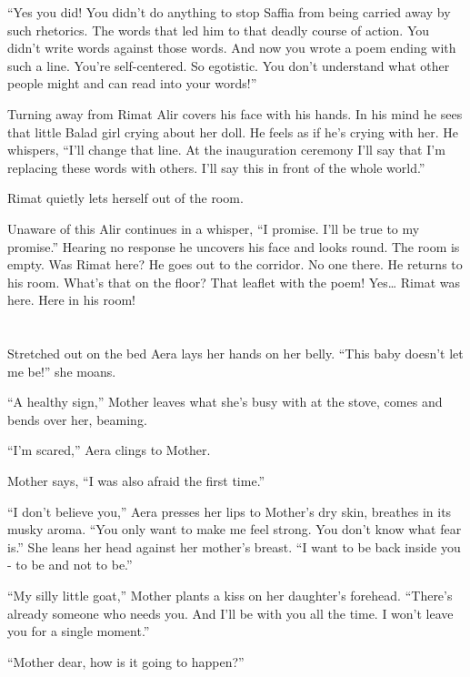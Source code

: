 \documentclass[twoside,11pt]{book}
\begin{document}
``Yes you did! You didn't do anything to stop Saffia from being carried away by such rhetorics. The words
that led him to that deadly course of action. You didn't write words against those words. And now you wrote a poem
ending with such a line. You're self-centered. So egotistic. You
don't understand what other people might and can read into your words!''

Turning away from Rimat Alir covers his face with his hands. In his mind he sees that little Balad girl crying about her
doll. He feels as if he's crying with her.  He whispers, ``I'll change that line. At the inauguration
ceremony I'll say that I'm replacing these words with others.  I'll say this in front of the whole
world.''

Rimat quietly lets herself out of the room.

Unaware of this Alir continues in a whisper, ``I promise. I'll be true to my promise.''
Hearing no response he uncovers his face and looks round. The room is empty. Was Rimat here? He goes out to the
corridor. No one there. He returns to his room. What's that on the floor? That leaflet with the poem! Yes{\dots} Rimat
was here. Here in his room!


\bigskip

\chapter{}

Stretched out on the bed Aera lays her hands on her belly. ``This baby doesn't let me be!''
she moans.

``A healthy sign,'' Mother leaves what she's busy with at the stove, comes and bends over her,
beaming.

``I'm scared,'' Aera clings to Mother.

Mother says, ``I was also afraid the first time.''

``I don't believe you,'' Aera presses her lips to Mother's dry skin, breathes
in its musky aroma. ``You only want to make me feel strong. You don't know what fear is.''
She leans her head against her mother's breast. ``I want to be back inside you - to be and not to
be.''

``My silly little goat,'' Mother plants a kiss on her daughter's forehead.
``There's already someone who needs you. And I'll be with you all the time. I won't leave you for a single
moment.''

``Mother dear, how is it going to happen?''
\end{document}
